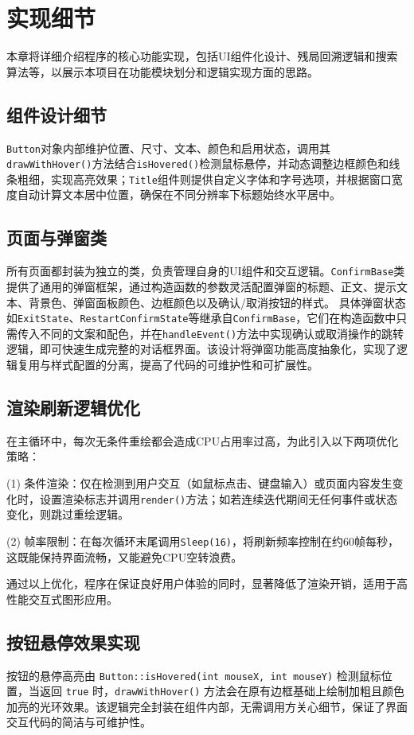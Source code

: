 \documentclass[12pt, a4paper]{article}
\begin{document}
\section{实现细节}
本章将详细介绍程序的核心功能实现，包括UI组件化设计、残局回溯逻辑和搜索算法等，以展示本项目在功能模块划分和逻辑实现方面的思路。

\subsection{组件设计细节}
\texttt{Button}对象内部维护位置、尺寸、文本、颜色和启用状态，调用其\texttt{drawWithHover()}方法结合\texttt{isHovered()}检测鼠标悬停，并动态调整边框颜色和线条粗细，实现高亮效果；\texttt{Title}组件则提供自定义字体和字号选项，并根据窗口宽度自动计算文本居中位置，确保在不同分辨率下标题始终水平居中。

\subsection{页面与弹窗类}
所有页面都封装为独立的类，负责管理自身的UI组件和交互逻辑。\texttt{ConfirmBase}类提供了通用的弹窗框架，通过构造函数的参数灵活配置弹窗的标题、正文、提示文本、背景色、弹窗面板颜色、边框颜色以及确认/取消按钮的样式。
具体弹窗状态如\texttt{ExitState}、\texttt{RestartConfirmState}等继承自\texttt{ConfirmBase}，它们在构造函数中只需传入不同的文案和配色，并在\texttt{handleEvent()}方法中实现确认或取消操作的跳转逻辑，即可快速生成完整的对话框界面。该设计将弹窗功能高度抽象化，实现了逻辑复用与样式配置的分离，提高了代码的可维护性和可扩展性。

\subsection{渲染刷新逻辑优化}
在主循环中，每次无条件重绘都会造成CPU占用率过高，为此引入以下两项优化策略：

(1) 条件渲染：仅在检测到用户交互（如鼠标点击、键盘输入）或页面内容发生变化时，设置渲染标志并调用\texttt{render()}方法；如若连续迭代期间无任何事件或状态变化，则跳过重绘逻辑。

(2) 帧率限制：在每次循环末尾调用\texttt{Sleep(16)}，将刷新频率控制在约60帧每秒，这既能保持界面流畅，又能避免CPU空转浪费。

通过以上优化，程序在保证良好用户体验的同时，显著降低了渲染开销，适用于高性能交互式图形应用。

\subsection{按钮悬停效果实现}
按钮的悬停高亮由 \texttt{Button::isHovered(int mouseX, int mouseY)} 检测鼠标位置，当返回 \texttt{true} 时，\texttt{drawWithHover()} 方法会在原有边框基础上绘制加粗且颜色加亮的光环效果。该逻辑完全封装在组件内部，无需调用方关心细节，保证了界面交互代码的简洁与可维护性。
\end{document}
